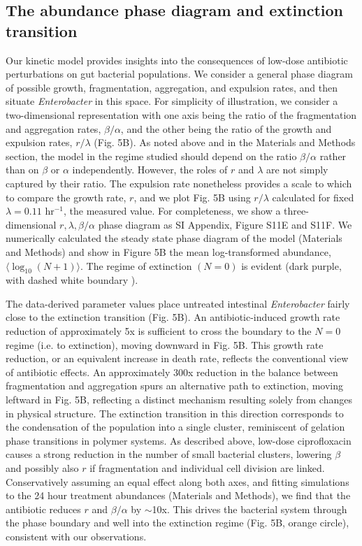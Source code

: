 \subsection*{The abundance phase diagram and extinction transition}

Our kinetic model provides insights into the consequences of low-dose antibiotic perturbations on gut bacterial populations. We consider a general phase diagram of possible growth, fragmentation, aggregation, and expulsion rates, and then situate \textit{Enterobacter} in this space. For simplicity of illustration, we consider a two-dimensional representation with one axis being the ratio of the fragmentation and aggregation rates, $\beta/\alpha$, and the other being the ratio of the growth and expulsion rates, $r/\lambda$ (Fig. 5B). As noted above and in the Materials and Methods section, the model in the regime studied should depend on the ratio $\beta/\alpha$ rather than on $\beta$ or $\alpha$ independently. However, the roles of $r$ and $\lambda$ are not simply captured by their ratio. The expulsion rate nonetheless provides a scale to which to compare the growth rate, $r$, and we plot Fig. 5B using  $r/\lambda$  calculated for fixed $\lambda = 0.11$ hr$^{-1}$, the measured value. For completeness, we show a three-dimensional $r,  \lambda, \beta/\alpha$ phase diagram as SI Appendix, Figure S11E and S11F. We numerically calculated the steady state phase diagram of the model (Materials and Methods) and show in Figure 5B the mean log-transformed abundance, $\langle\log_{10}(N+1)\rangle$. The regime of extinction $(N=0)$ is evident (dark purple, with dashed white boundary ). 


The data-derived parameter values place untreated intestinal \textit{Enterobacter} fairly close to the extinction transition (Fig. 5B). An antibiotic-induced growth rate reduction of approximately 5x is sufficient to cross the boundary to the $N=0$ regime (i.e. to extinction), moving downward in Fig. 5B. This growth rate reduction, or an equivalent increase in death rate, reflects the conventional view of antibiotic effects.  An approximately 300x reduction in the balance between fragmentation and aggregation spurs an alternative path to extinction, moving leftward in Fig. 5B, reflecting a distinct mechanism resulting solely from changes in physical structure. The extinction transition in this direction corresponds to the condensation of the population into a single cluster, reminiscent of gelation phase transitions in polymer systems. As described above, low-dose ciprofloxacin causes a strong reduction in the number of small bacterial clusters, lowering $\beta$ and possibly also $r$ if fragmentation and individual cell division are linked. Conservatively assuming an equal effect along both axes, and fitting simulations to the 24 hour treatment abundances (Materials and Methods), we find that the antibiotic reduces $r$ and $\beta/\alpha$ by $\sim$10x. This drives the bacterial system through the phase boundary and well into the extinction regime (Fig. 5B, orange circle), consistent with our observations. 

